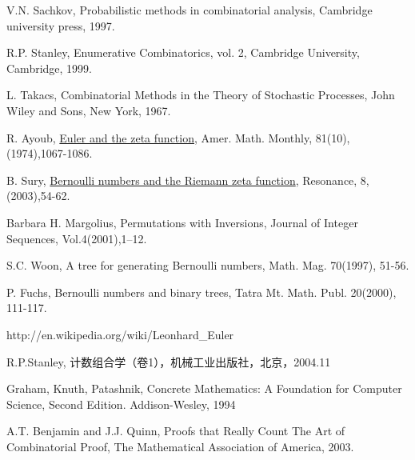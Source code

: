 \begin{thebibliography}{99}
 V.N. Sachkov,
Probabilistic methods in combinatorial analysis, Cambridge
university press, 1997.

 R.P. Stanley,
Enumerative Combinatorics, vol. 2, Cambridge University, Cambridge,
1999.

 L. Takacs,
Combinatorial Methods in the Theory of Stochastic Processes, John
Wiley and Sons, New York, 1967.


 R. Ayoub, \href{ref/Euler-and-the-zeta-fuction.pdf}{Euler and the zeta function}, Amer. Math. Monthly, 81(10), (1974),1067-1086.

 B. Sury, \href{ref/Bernoulli-numbers-and-the-Riemann-zeta-function.pdf}{Bernoulli numbers and the Riemann zeta function}, Resonance, 8, (2003),54-62.


Barbara H. Margolius, Permutations with Inversions, Journal of Integer Sequences, Vol.4(2001),1--12.


 S.C. Woon, A tree for generating Bernoulli numbers,
Math. Mag. 70(1997), 51-56.

 P. Fuchs, Bernoulli numbers and binary trees, Tatra
Mt. Math. Publ. 20(2000), 111-117.

 http://en.wikipedia.org/wiki/Leonhard\_Euler

R.P.Stanley, 计数组合学（卷1），机械工业出版社，北京，2004.11

Graham, Knuth, Patashnik, Concrete Mathematics: A Foundation for Computer Science, Second Edition. Addison-Wesley, 1994


 A.T. Benjamin and J.J. Quinn, Proofs that Really Count The Art of Combinatorial Proof,
The Mathematical Association of America, 2003.

\end{thebibliography}




